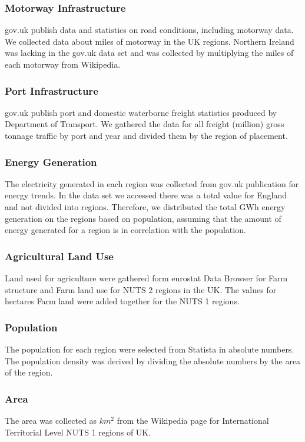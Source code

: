 \documentclass[10pt,a4paper]{article}
\begin{document}
\subsubsection{Motorway Infrastructure}
gov.uk publish data and statistics on road conditions, including motorway data. We collected data about miles of motorway in the UK regions. Northern Ireland was lacking in the gov.uk data set and was collected by multiplying the miles of each motorway from Wikipedia.
\cite{road,2013category}%
\subsubsection{Port Infrastructure}
gov.uk publish port and domestic waterborne freight statistics produced by Department of Transport. We gathered the data for all freight (million) gross tonnage traffic by port and year and divided them by the region of placement.
\cite{port}
\subsubsection{Energy Generation}
The electricity generated in each region was collected from gov.uk publication for energy trends. In the data set we accessed there was a total value for England and not divided into regions. Therefore, we distributed the total GWh energy generation on the regions based on population, assuming that the amount of energy generated for a region is in correlation with the population. 
\cite{energy}
\subsubsection{Agricultural Land Use}
Land used for agriculture were gathered form eurostat Data Browser for Farm structure and Farm land use for NUTS 2 regions in the UK. The values for hectares Farm land were added together for the NUTS 1 regions.
\cite{statistics}
\subsubsection{Population}
The population for each region were selected from Statista in absolute numbers. The population density was derived by dividing the absolute numbers by the area of the region. \cite{uk,regional,uk,2022international}
\subsubsection{Area}
The area was collected as $km^2$ from the Wikipedia page for International Territorial Level NUTS 1 regions of UK.
\cite{2022international,regional,uk}
\end{document}
